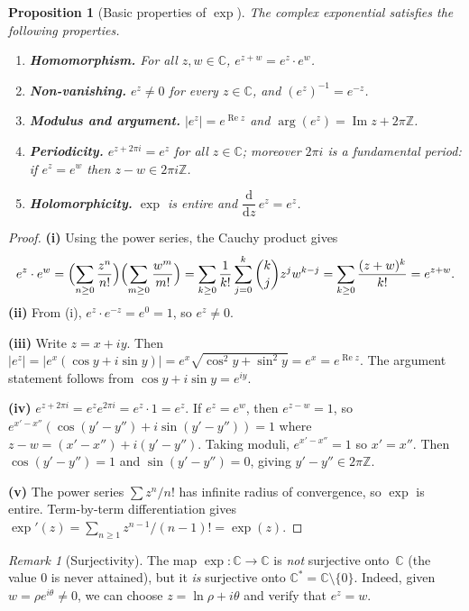\documentclass[12pt,a4paper,openany]{book}
\theoremstyle{definition}
\theoremstyle{plain}
\newtheorem{proposition}[definition]{Proposition}
\theoremstyle{remark}
\newtheorem{remark}[definition]{Remark}
\newcommand{\C}{\mathbb{C}}
\newcommand{\Z}{\mathbb{Z}}
\DeclareMathOperator{\re}{Re}
\DeclareMathOperator{\im}{Im}
\newcommand{\dd}{\mathrm{d}}
\newcommand{\abs}[1]{\left|#1\right|}
\begin{document}
\begin{proposition}[Basic properties of $\exp$]\label{prop:exp-properties}
The complex exponential satisfies the following properties.
\begin{enumerate}[label=\textup{(\roman*)}]
  \item \textbf{Homomorphism.} For all $z,w\in\C$,
    $e^{z+w} = e^z\cdot e^w$.
  \item \textbf{Non-vanishing.} $e^z \ne 0$ for every $z\in\C$, and
    $(e^z)^{-1} = e^{-z}$.
  \item \textbf{Modulus and argument.}
    $\abs{e^z} = e^{\re z}$ and $\arg(e^z) = \im z + 2\pi\Z$.
  \item \textbf{Periodicity.} $e^{z+2\pi i} = e^z$ for all $z\in\C$;
    moreover $2\pi i$ is a \emph{fundamental period}: if $e^z = e^w$ then
    $z - w \in 2\pi i\Z$.
  \item \textbf{Holomorphicity.} $\exp$ is entire and
    $\dfrac{\dd}{\dd z}\,e^z = e^z$.
\end{enumerate}
\end{proposition}

\begin{proof}
\textbf{(i)} Using the power series, the Cauchy product gives
\[
  e^z \cdot e^w
  = \Bigl(\sum_{n\ge 0}\frac{z^n}{n!}\Bigr)
    \Bigl(\sum_{m\ge 0}\frac{w^m}{m!}\Bigr)
  = \sum_{k\ge 0}\frac{1}{k!}\sum_{j=0}^{k}\binom{k}{j}z^j w^{k-j}
  = \sum_{k\ge 0}\frac{(z+w)^k}{k!}
  = e^{z+w}.
\]
\textbf{(ii)} From (i), $e^z \cdot e^{-z} = e^0 = 1$, so $e^z\ne 0$.

\textbf{(iii)} Write $z = x+iy$.  Then
$\abs{e^z} = \abs{e^x(\cos y + i\sin y)} = e^x\sqrt{\cos^2 y+\sin^2 y} = e^x = e^{\re z}$.
The argument statement follows from $\cos y + i\sin y = e^{iy}$.

\textbf{(iv)} $e^{z+2\pi i} = e^z e^{2\pi i} = e^z\cdot 1 = e^z$.
If $e^z = e^w$, then $e^{z-w}=1$, so $e^{x'-x''}(\cos(y'-y'')+i\sin(y'-y''))=1$
where $z-w = (x'-x'')+i(y'-y'')$.  Taking moduli, $e^{x'-x''}=1$ so $x'=x''$.
Then $\cos(y'-y'')=1$ and $\sin(y'-y'')=0$, giving $y'-y''\in 2\pi\Z$.

\textbf{(v)} The power series $\sum z^n/n!$ has infinite radius of convergence,
so $\exp$ is entire.  Term-by-term differentiation gives
$\exp'(z) = \sum_{n\ge 1} z^{n-1}/(n-1)! = \exp(z)$.
\end{proof}

\begin{remark}[Surjectivity]\label{rem:exp-surjective}
The map $\exp\colon\C\to\C$ is \emph{not} surjective onto~$\C$ (the value $0$
is never attained), but it \emph{is} surjective onto $\C^* = \C\setminus\{0\}$.
Indeed, given $w = \rho e^{i\theta}\ne 0$, we can choose $z = \ln\rho + i\theta$
and verify that $e^z = w$.
\end{remark}
\end{document}
